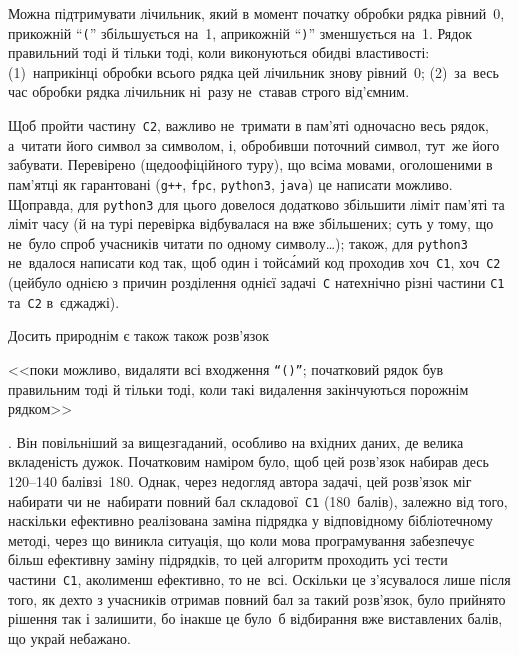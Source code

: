 \Tutorial

Можна підтримувати лічильник, який в момент початку обробки рядка рівний~0, 
при\nolinebreak[2] кожній ``\verb"("'' збільшується на~1, 
а\nolinebreak[2] при\nolinebreak[2] кожній ``\verb")"'' зменшується на~1.
Рядок правильний тоді й тільки тоді, коли виконуються обидві властивості: 
(1)~наприкінці обробки всього рядка цей лічильник знову рівний~0;
(2)~за~весь час обробки рядка лічильник ні~разу не~ставав строго від'ємним.

Щоб пройти частину~\texttt{C2}, важливо не~тримати в пам'яті одночасно весь рядок, а~читати його символ за символом, і, обробивши поточний символ, тут~же його забувати. Перевірено (ще\nolinebreak[3] до\nolinebreak[3] офіційного туру), що всіма мовами, оголошеними в пам'ятці як гарантовані (\verb"g++", \verb"fpc", \verb"python3", \verb"java") це написати можливо. Щоправда, для \verb"python3" для цього довелося додатково збільшити ліміт пам'яті та ліміт часу (й на турі перевірка відбувалася на вже збільшених; суть у тому, що не~було спроб учасників читати по одному символу\dots); також, для \verb"python3" не~вдалося написати код так, щоб один і той\nolinebreak[3] с\'{а}мий код проходив хоч~\texttt{C1}, хоч~\texttt{C2} (це\nolinebreak[3] й\nolinebreak[3] було однією з причин розділення однієї задачі~\texttt{C} на\nolinebreak[2] технічно різні частини \texttt{C1} та~\texttt{C2} в~єджаджі).


Досить природнім є також 
також розв'язок \begin{slshape}{<<поки можливо, видаляти всі входження \texttt{``()''}; початковий рядок був правильним тоді й тільки тоді, коли такі видалення закінчуються порожнім рядком>>}\end{slshape}. 
Він повільніший за вищезгаданий, особливо на вхідних даних, де велика вкладеність дужок.
Початковим наміром було, щоб цей розв'язок набирав десь 120--140 балів\nolinebreak[2] зі~180.
Однак, через недогляд автора задачі, цей розв'язок міг набирати чи не~набирати повний бал складової~\texttt{C1} (180~балів), залежно від того, наскільки ефективно реалізована заміна підрядка у відповідному бібліотечному методі, через що виникла ситуація, що коли мова програмування забезпечує більш ефективну заміну підрядків, то цей алгоритм проходить усі тести частини~\texttt{C1}, а\nolinebreak[3] коли\nolinebreak[2] менш ефективно, то не~всі. Оскільки це з'ясувалося лише після того, як дехто з учасників отримав повний бал за такий розв'язок, було прийнято рішення так і залишити, бо інакше це було~б відбирання вже виставлених балів, що украй небажано.


